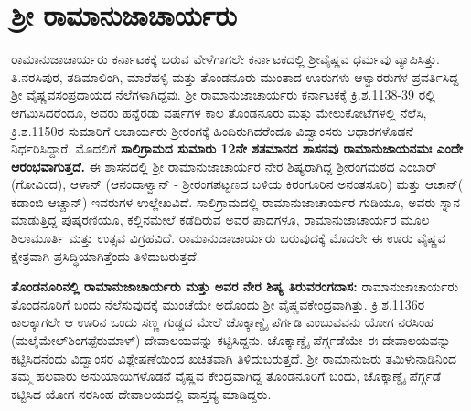 \vskip -7pt


\section*{ಶ‍್ರೀ ರಾಮಾನುಜಾಚಾರ್ಯರು}

\vskip -2pt

ರಾಮಾನುಜಾಚಾರ್ಯರು ಕರ್ನಾಟಕಕ್ಕೆ ಬರುವ ವೇಳೆಗಾಗಲೇ ಕರ್ನಾಟಕದಲ್ಲಿ ಶ‍್ರೀವೈಷ್ಣವ ಧರ್ಮವು ವ್ಯಾಪಿಸಿತ್ತು. ತಿ.ನರಸಿಪುರ, ತಡಿಮಾಲಿಂಗಿ, ಮಾರೆಹಳ್ಳಿ ಮತ್ತು ತೊಂಡನೂರು ಮುಂತಾದ ಊರುಗಳು ಆಳ್ವಾರರುಗಳ ಪ್ರವರ್ತಿಸಿದ್ದ ಶ‍್ರೀ ವೈಷ್ಣವಸಂಪ್ರದಾಯದ ನೆಲೆಗಳಾಗಿದ್ದವು. ಶ‍್ರೀ ರಾಮಾನುಜಾಚಾರ್ಯರು ಕರ್ನಾಟಕಕ್ಕೆ ಕ್ರಿ.ಶ.1138-39 ರಲ್ಲಿ ಆಗಮಿಸಿದರೆಂದೂ, ಅವರು ಹನ್ನೆರಡು ವರ್ಷಗಳ ಕಾಲ ತೊಂಡನೂರು ಮತ್ತು ಮೇಲುಕೋಟೆಗಳಲ್ಲಿ ನೆಲೆಸಿ, ಕ್ರಿ.ಶ.1150ರ ಸುಮಾರಿಗೆ ಆಚಾರ್ಯರು ಶ‍್ರೀರಂಗಕ್ಕೆ ಹಿಂದಿರುಗಿದರೆಂದೂ ವಿದ್ವಾಂಸರು ಆಧಾರಗಳೊಡನೆ ನಿರ್ಧರಿಸಿದ್ದಾರೆ. ಮೊದಲಿಗೆ \textbf{ಸಾಲಿಗ್ರಾಮದ ಸುಮಾರು 12ನೇ ಶತಮಾನದ ಶಾಸನವು ರಾಮಾನುಜಾಯನಮಃ ಎಂದೇ ಆರಂಭವಾಗುತ್ತದೆ.} ಈ ಶಾಸನದಲ್ಲಿ ಶ‍್ರೀ ರಾಮಾನುಜಾಚಾರ್ಯರ ನೇರ ಶಿಷ್ಯರಾಗಿದ್ದ ಶ‍್ರೀರಂಗಮಠದ ಎಂಬಾರ್​(ಗೋವಿಂದ), ಆಳಾನ್​ (ಆನಂದಾಳ್ವಾನ್​ - ಶ‍್ರೀರಂಗಪಟ್ಟಣದ ಬಳಿಯ ಕಿರಂಗೂರಿನ ಅನಂತಸೂರಿ) ಮತ್ತು ಆಚಾನ್​( ಕಡಾಂಬಿ ಆಚ್ಚಾನ್​) ಇವರುಗಳ ಉಲ್ಲೇಖವಿದೆ. ಸಾಲಿಗ್ರಾಮದಲ್ಲಿ ರಾಮಾನುಜಾಚಾರ್ಯರ ಗುಡಿಯೂ, ಅವರು ಸ್ನಾನ ಮಾಡುತ್ತಿದ್ದ ಪುಷ್ಕರಣಿಯೂ, ಕಲ್ಲಿನಮೇಲೆ ಕಡೆದಿರುವ ಅವರ ಪಾದಗಳೂ, ರಾಮಾನುಜಾಚಾರ್ಯರ ಮೂಲ ಶಿಲಾಮೂರ್ತಿ ಮತ್ತು ಉತ್ಸವ ವಿಗ್ರಹವಿದೆ. ರಾಮಾನುಜಾಚಾರ್ಯರು ಬರುವುದಕ್ಕೆ ಮೊದಲೇ ಈ ಊರು ವೈಷ್ಣವ ಕ್ಷೇತ್ರವಾಗಿ ಪ್ರಸಿದ್ಧಿಯಾಗಿತ್ತೆಂದು ತಿಳಿದುಬರುತ್ತದೆ.

\textbf{ತೊಂಡನೂರಿನಲ್ಲಿ ರಾಮಾನುಜಾಚಾರ್ಯರು ಮತ್ತು ಅವರ ನೇರ ಶಿಷ್ಯ ತಿರುವರಂಗದಾಸ:} ರಾಮಾನುಜಾಚಾರ್ಯರು ತೊಂಡನೂರಿಗೆ ಬಂದು ನೆಲೆಸುವುದಕ್ಕೆ ಮುಂಚೆಯೇ ಅದೊಂದು ಶ‍್ರೀ ವೈಷ್ಣವಕೇಂದ್ರವಾಗಿತ್ತು. ಕ್ರಿ.ಶ.1136ರ ಕಾಲಕ್ಕಾಗಲೇ ಆ ಊರಿನ ಒಂದು ಸಣ್ಣ ಗುಡ್ಡದ ಮೇಲೆ ಚೊಕ್ಕಾಣ್ಡೈ ಪೆರ್ಗಡಿ ಎಂಬುವವನು ಯೋಗ ನರಸಿಂಹ (ಮಲೈಮೇಲ್​\break ಶಿಂಗಪ್ಪೆರುಮಾಳ್​) ದೇವಾಲಯವನ್ನು ಕಟ್ಟಿಸಿದ್ದನು. ಚೊಕ್ಕಾಣ್ಡೈ ಪೆರ್ಗ್ಗಡೆಯೇ ಈ ದೇವಾಲಯವನ್ನು ಕಟ್ಟಿಸಿದನೆಂದು ವಿದ್ವಾಂಸರ ವಿಶ್ಲೇಷಣೆಯಿಂದ ಖಚಿತವಾಗಿ ತಿಳಿದುಬರುತ್ತದೆ. ಶ‍್ರೀ ರಾಮಾನುಜರು ತಮಿಳುನಾಡಿನಿಂದ ತಮ್ಮ ಹಲವಾರು ಅನುಯಾಯಿಗಳೊಡನೆ ವೈಷ್ಣವ ಕೇಂದ್ರವಾಗಿದ್ದ ತೊಂಡನೂರಿಗೆ ಬಂದು, ಚೊಕ್ಕಾಣ್ಡೈ ಪೆರ್ಗ್ಗಡೆ ಕಟ್ಟಿಸಿದ ಯೋಗ ನರಸಿಂಹ ದೇವಾಲಯದಲ್ಲಿ ವಾಸ್ತವ್ಯ ಮಾಡಿದ್ದರು.

